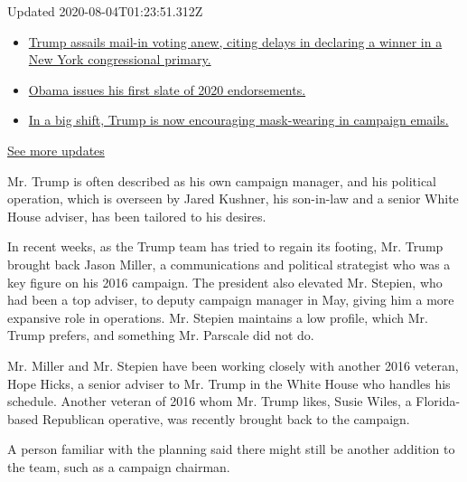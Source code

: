 Updated 2020-08-04T01:23:51.312Z

\begin{itemize}
\tightlist
\item
  \href{https://www.nytimes3xbfgragh.onion/2020/08/03/us/elections/biden-vs-trump.html?action=click\&pgtype=Article\&state=default\&region=MAIN_CONTENT_1\&context=storylines_live_updates\#link-6494b448}{Trump
  assails mail-in voting anew, citing delays in declaring a winner in a
  New York congressional primary.}
\item
  \href{https://www.nytimes3xbfgragh.onion/2020/08/03/us/elections/biden-vs-trump.html?action=click\&pgtype=Article\&state=default\&region=MAIN_CONTENT_1\&context=storylines_live_updates\#link-3de249e6}{Obama
  issues his first slate of 2020 endorsements.}
\item
  \href{https://www.nytimes3xbfgragh.onion/2020/08/03/us/elections/biden-vs-trump.html?action=click\&pgtype=Article\&state=default\&region=MAIN_CONTENT_1\&context=storylines_live_updates\#link-54e34d20}{In
  a big shift, Trump is now encouraging mask-wearing in campaign
  emails.}
\end{itemize}

\href{https://www.nytimes3xbfgragh.onion/2020/08/03/us/elections/biden-vs-trump.html?action=click\&pgtype=Article\&state=default\&region=MAIN_CONTENT_1\&context=storylines_live_updates}{See
more updates}

Mr. Trump is often described as his own campaign manager, and his
political operation, which is overseen by Jared Kushner, his son-in-law
and a senior White House adviser, has been tailored to his desires.

In recent weeks, as the Trump team has tried to regain its footing, Mr.
Trump brought back Jason Miller, a communications and political
strategist who was a key figure on his 2016 campaign. The president also
elevated Mr. Stepien, who had been a top adviser, to deputy campaign
manager in May, giving him a more expansive role in operations. Mr.
Stepien maintains a low profile, which Mr. Trump prefers, and something
Mr. Parscale did not do.

Mr. Miller and Mr. Stepien have been working closely with another 2016
veteran, Hope Hicks, a senior adviser to Mr. Trump in the White House
who handles his schedule. Another veteran of 2016 whom Mr. Trump likes,
Susie Wiles, a Florida-based Republican operative, was recently brought
back to the campaign.

A person familiar with the planning said there might still be another
addition to the team, such as a campaign chairman.

